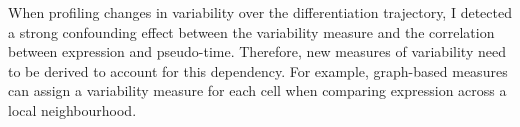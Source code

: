When profiling changes in variability over the differentiation trajectory, I detected a strong confounding effect between the variability measure and the correlation between expression and pseudo-time. Therefore, new measures of variability need to be derived to account for this dependency. For example, graph-based measures can assign a variability measure for each cell when comparing expression across a local neighbourhood.

